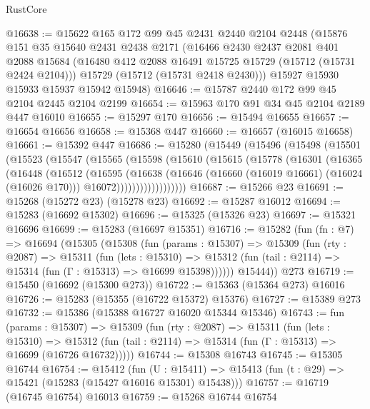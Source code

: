 \begin{lexlean}{RustCore}
\begin{coremodule}
@16638 := @15622
    @165
    @172
    @99
    @45
    @2431
    @2440
    @2104
    @2448
    (@15876
      @151
      @35
      @15640
      @2431
      @2438
      @2171
      (@16466
        @2430
        @2437
        @2081
        @401
        @2088
        @15684
        (@16480 @412 @2088 @16491 @15725 @15729 (@15712 (@15731 @2424 @2104)))
        @15729
        (@15712 (@15731 @2418 @2430)))
      @15927
      @15930
      @15933
      @15937
      @15942
      @15948)
@16646 := @15787 @2440 @172 @99 @45 @2104 @2445 @2104 @2199
@16654 := @15963 @170 @91 @34 @45 @2104 @2189 @447 @16010
@16655 := @15297 @170
@16656 := @15494 @16655
@16657 := @16654 @16656
@16658 := @15368 @447
@16660 := @16657 (@16015 @16658)
@16661 := @15392 @447
@16686 := @15280
    (@15449
      (@15496
        (@15498
          (@15501
            (@15523
              (@15547
                (@15565
                  (@15598
                    (@15610
                      (@15615
                        (@15778
                          (@16301
                            (@16365
                              (@16448
                                (@16512
                                  (@16595
                                    (@16638
                                      (@16646
                                        (@16660 (@16019 @16661) (@16024 (@16026 @170)))
                                        @16072))))))))))))))))))
@16687 := @15266 @23
@16691 := @15268 (@15272 @23) (@15278 @23)
@16692 := @15287 @16012
@16694 := @15283 (@16692 @15302)
@16696 := @15325 (@15326 @23)
@16697 := @15321 @16696
@16699 := @15283 (@16697 @15351)
@16716 := @15282
    (fun (fn : @7) =>
    @16694
      (@15305
        (@15308
          (fun (params : @15307) =>
          @15309
            (fun (rty : @2087) =>
            @15311
              (fun (lets : @15310) =>
              @15312 (fun (tail : @2114) => @15314 (fun (Γ : @15313) => @16699 @15398))))))
        @15444))
    @273
@16719 := @15450 (@16692 (@15300 @273))
@16722 := @15363 (@15364 @273) @16016
@16726 := @15283 (@15355 (@16722 @15372) @15376)
@16727 := @15389 @273
@16732 := @15386 (@15388 @16727 @16020 @15344 @15346)
@16743 := fun (params : @15307) =>
  @15309
    (fun (rty : @2087) =>
    @15311
      (fun (lets : @15310) =>
      @15312 (fun (tail : @2114) => @15314 (fun (Γ : @15313) => @16699 (@16726 @16732)))))
@16744 := @15308 @16743
@16745 := @15305 @16744
@16754 := @15412
    (fun (U : @15411) => @15413 (fun (t : @29) => @15421 (@15283 (@15427 @16016 @15301) @15438)))
@16757 := @16719 (@16745 @16754) @16013
@16759 := @15268 @16744 @16754

\end{coremodule}
\end{lexlean}
